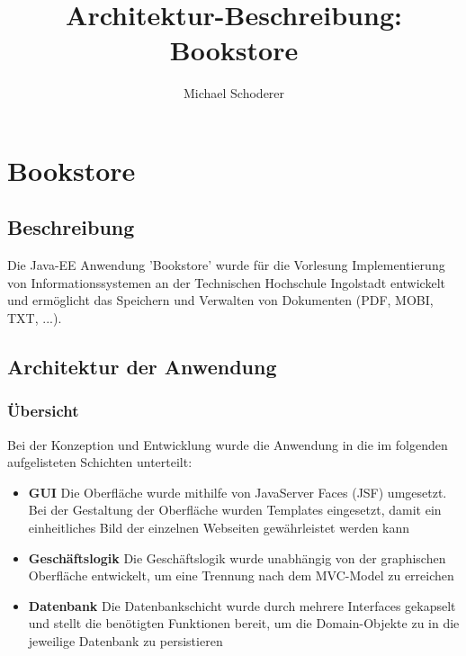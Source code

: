 \documentclass[12pt,a4paper]{book}
\author{Michael Schoderer}
\title{Architektur-Beschreibung: Bookstore}
\begin{document}
	\chapter{Bookstore}
	\section{Beschreibung}
	Die Java-EE Anwendung 'Bookstore' wurde für die Vorlesung Implementierung von Informationssystemen an der Technischen Hochschule Ingolstadt entwickelt und ermöglicht das Speichern und Verwalten von Dokumenten (PDF, MOBI, TXT, ...).
	\section{Architektur der Anwendung}
	\subsection{Übersicht}
	Bei der Konzeption und Entwicklung wurde die Anwendung in die im folgenden aufgelisteten Schichten unterteilt:
	\begin{itemize}
		\item \textbf{GUI} Die Oberfläche wurde mithilfe von JavaServer Faces (JSF) umgesetzt. Bei der Gestaltung der Oberfläche wurden Templates eingesetzt, damit ein einheitliches Bild der einzelnen Webseiten gewährleistet werden kann
		\item \textbf{Geschäftslogik} Die Geschäftslogik wurde unabhängig von der graphischen Oberfläche entwickelt, um eine Trennung nach dem MVC-Model zu erreichen
		\item \textbf{Datenbank} Die Datenbankschicht wurde durch mehrere Interfaces gekapselt und stellt die benötigten Funktionen bereit, um die Domain-Objekte zu in die jeweilige Datenbank zu persistieren		
		\end{itemize}
		
		
		
		
\end{document}
